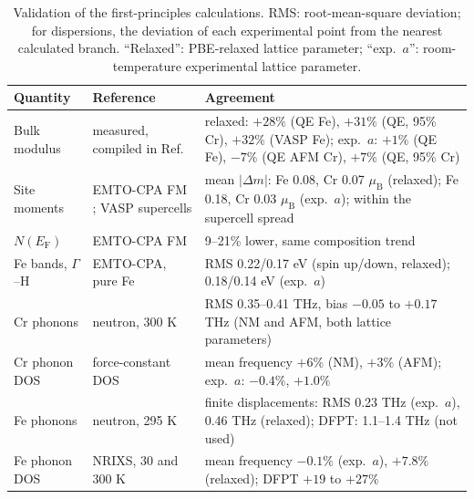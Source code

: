 \documentclass[final,3p,times]{elsarticle}
\begin{document}
\begin{table}[!htbp]
\centering
\caption{Validation of the first-principles calculations. RMS: root-mean-square deviation; for dispersions, the deviation of each experimental point from the nearest calculated branch. ``Relaxed'': PBE-relaxed lattice parameter; ``exp.\ $a$'': room-temperature experimental lattice parameter.}
\label{tab:validation}
\small
\begin{tabular}{@{}p{3.0cm}p{4.2cm}p{6.6cm}@{}}
\toprule
Quantity & Reference & Agreement \\
\midrule
Bulk modulus & measured, compiled in Ref.~\cite{korzhavyi2009electronic} & relaxed: $+28\%$ (QE Fe), $+31\%$ (QE, 95\% Cr), $+32\%$ (VASP Fe); exp.\ $a$: $+1\%$ (QE Fe), $-7\%$ (QE AFM Cr), $+7\%$ (QE, 95\% Cr) \\
Site moments & EMTO-CPA FM \cite{korzhavyi2009electronic}; VASP supercells \cite{klaver2006magnetism} & mean $|\Delta m|$: Fe 0.08, Cr 0.07 $\mu_{\mathrm B}$ (relaxed); Fe 0.18, Cr 0.03 $\mu_{\mathrm B}$ (exp.\ $a$); within the supercell spread \\
$N(E_{\mathrm F})$ & EMTO-CPA FM \cite{korzhavyi2009electronic} & 9--21\% lower, same composition trend \\
Fe bands, $\Gamma$--H & EMTO-CPA, pure Fe \cite{korzhavyi2009electronic} & RMS 0.22/0.17 eV (spin up/down, relaxed); 0.18/0.14 eV (exp.\ $a$) \\
Cr phonons & neutron, 300 K \cite{shaw1971investigation} & RMS 0.35--0.41 THz, bias $-0.05$ to $+0.17$ THz (NM and AFM, both lattice parameters) \\
Cr phonon DOS & force-constant DOS \cite{fultz1995phonon} & mean frequency $+6\%$ (NM), $+3\%$ (AFM); exp.\ $a$: $-0.4\%$, $+1.0\%$ \\
Fe phonons & neutron, 295 K \cite{minkiewicz1967phonon} & finite displacements: RMS 0.23 THz (exp.\ $a$), 0.46 THz (relaxed); DFPT: 1.1--1.4 THz (not used) \\
Fe phonon DOS & NRIXS, 30 and 300 K \cite{mauger2014nonharmonic} & mean frequency $-0.1\%$ (exp.\ $a$), $+7.8\%$ (relaxed); DFPT $+19$ to $+27\%$ \\
\bottomrule
\end{tabular}
\end{table}
\end{document}
